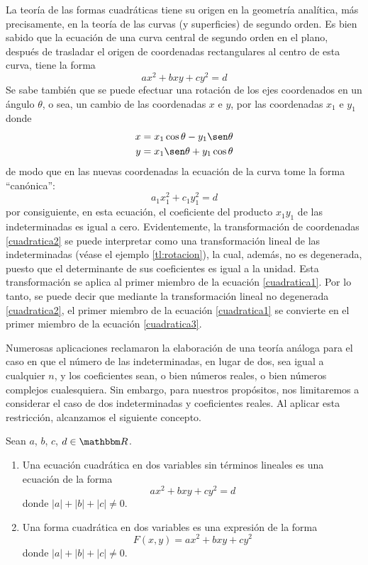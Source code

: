 La teoría de las formas cuadráticas tiene su origen en la geometría analítica, más precisamente, en la teoría de las curvas (y superficies) de segundo orden. Es bien sabido que la ecuación de una curva central de segundo orden en el plano, después de trasladar el origen de coordenadas rectangulares al centro de esta curva, tiene la forma
\begin{equation}
    ax^2 + bxy + cy^2 = d \label{cuadratica1}
\end{equation}
Se sabe también que se puede efectuar una rotación de los ejes coordenados en un ángulo $\theta$, o sea, un cambio de las coordenadas $x$ e $y$, por las coordenadas $x_1$ e $y_1$ donde
\begin{equation}
    \begin{aligned}
        x & = x_1 \cos \theta - y_1 \sen \theta \\
        y & = x_1 \sen \theta + y_1 \cos \theta
    \end{aligned} \label{cuadratica2}
\end{equation}
de modo que en las nuevas coordenadas la ecuación de la curva tome la forma “canónica”:
\begin{equation}
    a_1x_1^2 + c_1y_1^2 = d \label{cuadratica3}
\end{equation}
por consiguiente, en esta ecuación, el coeficiente del producto $x_1y_1$ de las indeterminadas es igual a cero. Evidentemente, la transformación de coordenadas \eqref{cuadratica2} se puede interpretar como una transformación lineal de las indeterminadas (véase el ejemplo \ref{tl:rotacion}), la cual, además, no es degenerada, puesto que el determinante de sus coeficientes es igual a la unidad. Esta transformación se aplica al primer miembro de la ecuación \eqref{cuadratica1}. Por lo tanto, se puede decir que mediante la transformación lineal no degenerada \eqref{cuadratica2}, el primer miembro de la ecuación \eqref{cuadratica1} se convierte en el primer miembro de la ecuación \eqref{cuadratica3}.

Numerosas aplicaciones reclamaron la elaboración de una teoría análoga para el caso en que el número de las indeterminadas, en lugar de dos, sea igual a cualquier $n$, y los coeficientes sean, o bien números reales, o bien números complejos cualesquiera. Sin embargo, para nuestros propósitos, nos limitaremos a considerar el caso de dos indeterminadas y coeficientes reales. Al aplicar esta restricción, alcanzamos el siguiente concepto.

\begin{definition}
    Sean $a$, $b$, $c$, $d \in \RR$.
    \begin{enumerate}[label=\roman*)]
        \item Una ecuación cuadrática en dos variables sin términos lineales es una ecuación de la forma
        $$ax^2 + bxy + cy^2 = d$$
        donde $|a| + |b| + |c| \neq 0$.\newpage
        \item Una forma cuadrática en dos variables es una expresión de la forma
        $$F(x, y) = ax^2 + bxy + cy^2$$
        donde $|a| + |b| + |c| \neq 0$.
    \end{enumerate}
\end{definition}

